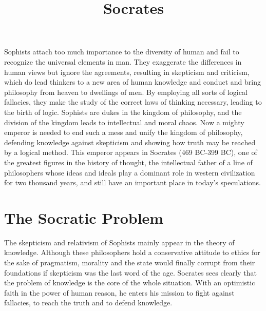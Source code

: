 \documentclass[11pt]{article}
\title{Socrates}
\date{}
\begin{document}
  \maketitle

  \linenumbers

Sophists attach too much importance to the diversity of human and fail to recognize the universal elements in man. 
They exaggerate the differences in human views but ignore the agreements, resulting in skepticism and criticism, which do lead thinkers to a new area of human knowledge and conduct and bring philosophy from heaven to dwellings of men. 
By employing all sorts of logical fallacies, they make the study of the correct laws of thinking necessary, leading to the birth of logic. 
Sophists are dukes in the kingdom of philosophy, and the division of the kingdom leads to intellectual and moral chaos. 
Now a mighty emperor is needed to end such a mess and unify the kingdom of philosophy, defending knowledge against skepticism and showing how truth may be reached by a logical method. 
This emperor appears in Socrates (469 BC-399 BC), one of the greatest figures in the history of thought, the intellectual father of a line of philosophers whose ideas and ideals play a dominant role in western civilization for two thousand years, and still have an important place in today’s speculations.

\section{The Socratic Problem}
The skepticism and relativism of Sophists mainly appear in the theory of knowledge. 
Although these philosophers hold a conservative attitude to ethics for the sake of pragmatism, morality and the state would finally corrupt from their foundations if skepticism was the last word of the age. 
Socrates sees clearly that the problem of knowledge is the core of the whole situation. 
With an optimistic faith in the power of human reason, he enters his mission to fight against fallacies, to reach the truth and to defend knowledge.

\newline
\end{document}
